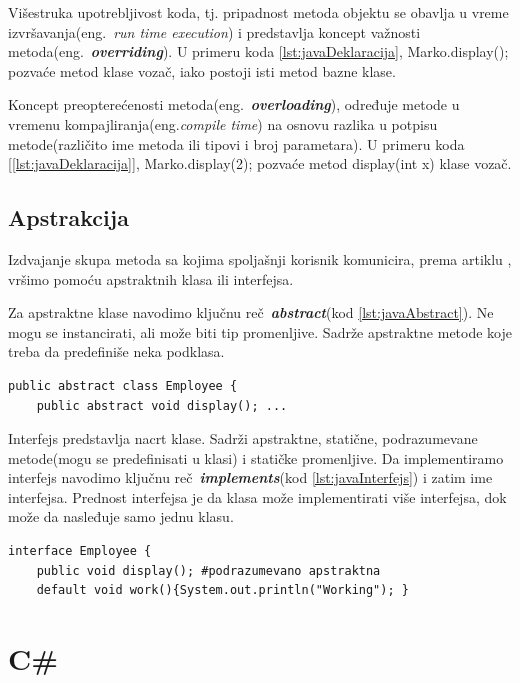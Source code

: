 \documentclass[a4paper]{article}
\begin{document}
Višestruka upotrebljivost koda, tj. pripadnost metoda objektu se obavlja u vreme izvršavanja(eng.~{\em run time execution}) i predstavlja koncept važnosti metoda(eng.~{\em\textbf{overriding}})\cite{horstmann2017core}. U primeru koda \ref{lst:javaDeklaracija}, Marko.display(); pozvaće metod klase vozač, iako postoji isti metod bazne klase.

Koncept preopterećenosti metoda(eng.~{\em\textbf{overloading}})\cite{horstmann2017core}, određuje metode u vremenu kompajliranja(eng.{\em compile time}) na osnovu razlika u potpisu metode(različito ime metoda ili tipovi i broj parametara). U primeru koda [\ref{lst:javaDeklaracija}], Marko.display(2); pozvaće metod display(int x) klase vozač.

\subsection{Apstrakcija}
\label{subsec:javaApstrakcija}

Izdvajanje skupa metoda sa kojima spoljašnji korisnik komunicira, prema artiklu \cite{oopJava}, vršimo pomoću apstraktnih klasa ili interfejsa.

Za apstraktne klase navodimo ključnu reč~{\em \textbf{abstract}}(kod \ref{lst:javaAbstract}). Ne mogu se instancirati, ali može biti tip promenljive. Sadrže apstraktne metode koje treba da predefiniše neka podklasa.

\begin{lstlisting}[caption={Apstraktna klasa},frame=single, label=lst:javaAbstract]
public abstract class Employee {
	public abstract void display(); ...
\end{lstlisting}

Interfejs predstavlja nacrt klase. Sadrži apstraktne, statične, podrazumevane metode(mogu se predefinisati u klasi) i statičke promenljive. Da implementiramo interfejs navodimo ključnu reč~{\em \textbf{implements}}(kod \ref{lst:javaInterfejs}) i zatim ime interfejsa. Prednost interfejsa\cite{horstmann2017core} je da klasa može implementirati više interfejsa, dok može da nasleđuje samo jednu klasu.

\begin{lstlisting}[caption={Interfejs},frame=single, label=lst:javaInterfejs]
interface Employee {
	public void display(); #podrazumevano apstraktna
	default void work(){System.out.println("Working"); }
\end{lstlisting}


\section{C\#}
\label{sec:csharp}
\end{document}
